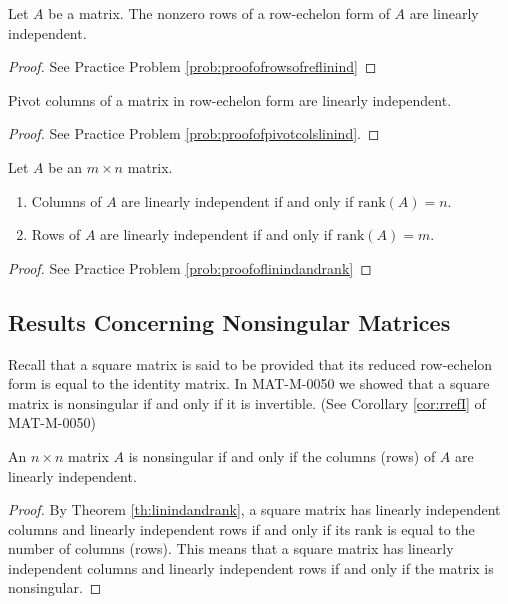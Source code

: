\documentclass{ximera}
\begin{document}
\begin{theorem}\label{th:rowsofreflinind}
Let $A$ be a matrix.  The nonzero rows of a row-echelon form of $A$ are linearly independent.
\end{theorem}
\begin{proof}
See Practice Problem \ref{prob:proofofrowsofreflinind}
\end{proof}

\begin{theorem}\label{th:pivotcolslinind}
Pivot columns of a matrix in row-echelon form are linearly independent.
\end{theorem}
\begin{proof}
See Practice Problem \ref{prob:proofofpivotcolslinind}.
\end{proof}

\begin{theorem}\label{th:linindandrank}
Let $A$ be an $m\times n$ matrix.
\begin{enumerate}
    \item Columns of $A$ are linearly independent if and only if $\mbox{rank}(A)=n$.
    \item Rows of $A$ are linearly independent if and only if  $\mbox{rank}(A)=m$.
\end{enumerate}
\end{theorem}
\begin{proof}
See Practice Problem \ref{prob:proofoflinindandrank}
\end{proof}


\subsection{Results Concerning Nonsingular Matrices}
Recall that a square matrix is said to be  provided that its reduced row-echelon form is equal to the identity matrix.  In MAT-M-0050 we showed that a square matrix is nonsingular if and only if it is invertible. (See Corollary \ref{cor:rrefI} of MAT-M-0050)

\begin{theorem}\label{th:linindcolsnonsingular}
An $n\times n$ matrix $A$ is nonsingular if and only if the columns (rows) of $A$ are linearly independent.
\end{theorem}
\begin{proof}
By Theorem \ref{th:linindandrank}, a square matrix has linearly independent columns and linearly independent rows if and only if its rank is equal to the number of columns (rows).  This means that a square matrix has linearly independent columns and linearly independent rows if and only if the matrix is nonsingular.
\end{proof}
\end{document}
